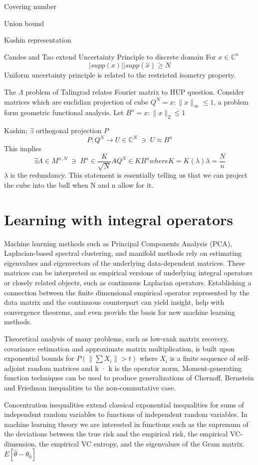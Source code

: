 \documentclass[a4paper]{article}
\newcommand{\Complex}{\mathbb C}
\theoremstyle{plain}
\theoremstyle{definition}
\theoremstyle{remark}
\newcommand{\st}{\; \ni \;}
\numberwithin{equation}{section}
\begin{document}
Covering number

Union bound

Kashin representation

Candes and Tao extend Uncertainty Principle to discrete domain
For $x \in \Complex^n$
\begin{equation*}
  |supp(x)| |supp(\hat{x}) \geq N
\end{equation*}
Uniform uncertainty principle is related to the restricted isometry property.

The $\Lambda$ problem of Talingrad relates Fourier matrix to HUP question.  Consider matrices which are euclidian projection of cube $Q^N = {x : \parallel x \parallel_\infty  \leq 1}$, a problem form geometric functional analysis.  Let $B^n = {x : \parallel x \parallel_2  \leq 1}$

Kashin; $\exists$ orthogonal projection $P$
\begin{equation*}
  P : Q^N \rightarrow U \in \Complex^N \st U \approx B^n
\end{equation*}
This implies
\begin{equation*}
  \exists A \in M^{n,N} \st B^n \in \frac{K}{\sqrt{N}} A Q^N \in K B^n where K = K(\lambda) \lambda=\frac{N}{n}
\end{equation*}
$\lambda$ is the redundancy.  This statement is essentially telling us that we can project the cube into the ball when N and n allow for it.

\section{Learning with integral operators}
Machine learning methods such as Principal Components Analysis (PCA), Laplacian-based spectral clustering, and manifold methods rely on estimating eigenvalues and eigenvectors of the underlying data-dependent matrices.  These matrices can be interpreted as empirical versions of underlying integral operators or closely related objects, such as continuous Laplacian operators.  Establishing a connection between the finite dimensional empirical operator represented by the data matrix and the continuous counterpart can yield insight, help with convergence theorems, and even provide the basis for new machine learning methods.

Theoretical analysis of many problems, such as low-rank matrix recovery, covariance estimation and approximate matrix multiplication, is built upon exponential bounds for $P(\| \sum X_i \| > t)$ where ${X_i}$ is a finite sequence of self-adjoint random matrices and k · k is the operator norm. Moment-generating function techniques can be used to produce generalizations of Chernoff, Bernstein and Friedman inequalities to the non-commutative case.

Concentration inequalities extend classical exponential inequalities for sums of independent random variables to functions of independent random variables.  In machine learning theory we are interested in functions such as the supremum of the deviations between the true risk and the empirical risk, the empirical VC-dimension, the empirical VC entropy, and the eigenvalues of the Gram matrix.
$E[ \hat{\theta} - \theta_0 ]$




\end{document}
